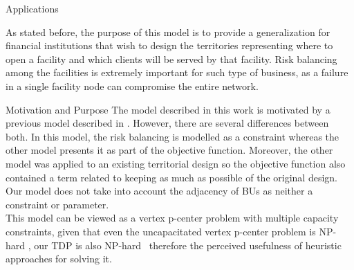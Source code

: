 \documentclass{beamer}
\begin{document}
\begin{frame}{Applications}
    \begin{figure}
        \centering
    \end{figure}
   As stated before, the purpose of this model is to provide a generalization for financial institutions that wish to design the territories representing where to open a facility and which clients will be served by that facility. Risk balancing among the facilities is extremely important for such type of business, as a failure in a single facility node can compromise the entire network.
\end{frame}

\begin{frame}{Motivation and Purpose}
    The model described in this work is motivated by a previous model described in \cite{jimo2020}. However, there are several differences between both. In this model, the risk balancing is modelled as a constraint whereas the other model presents it as part of the objective function. Moreover, the other model was applied to an existing territorial design so the objective function also contained a term related to keeping as much as possible of the original design. Our model does not take into account the adjacency of BUs as neither a constraint or parameter. \\
    This model can be viewed as a vertex p-center problem with multiple capacity constraints, given that even the uncapacitated vertex p-center problem is NP-hard \cite{eswa2016}, our TDP is also NP-hard \, therefore the perceived usefulness of heuristic approaches for solving it.
\end{frame}
\end{document}
